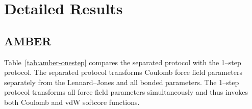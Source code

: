 \documentclass[journal=jctcce,manuscript=suppinfo]{achemso}
\begin{document}
\section{Detailed Results}
\label{sec:problems}

\subsection{AMBER}
\label{sec:amber-probs}

Table~\ref{tab:amber-onestep} compares the separated protocol with the
1--step protocol.  The separated protocol transforms Coulomb force
field parameters separately from the Lennard--Jones and all bonded
parameters.  The 1--step protocol transforms all force field
parameters simultaneously and thus invokes both Coulomb and vdW
softcore functions.
\begin{table}
  \begin{minipage}{\linewidth}
    \caption{Comparison between separated and 1--step protocol in
      AMBER.  The data for the 1--step protocol highlights problems in
      the code in red. $\Delta G_\mathrm{sol}$ has been computed with pmemd.  
      $\Delta G_\mathrm{vac}$ has been computed with 
      sander.}\label{tab:amber-onestep}
\end{minipage}
\end{table}
\end{document}
